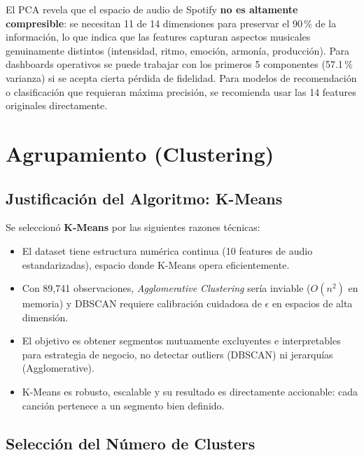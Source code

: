 \documentclass[12pt,a4paper]{article}
\begin{document}
\begin{ejecutivo}
El PCA revela que el espacio de audio de Spotify \textbf{no es altamente compresible}:
se necesitan 11 de 14 dimensiones para preservar el 90\,\% de la informaci\'on, lo que
indica que las features capturan aspectos musicales genuinamente distintos (intensidad,
ritmo, emoci\'on, armon\'ia, producci\'on). Para dashboards operativos se puede trabajar
con los primeros 5 componentes (57.1\,\% varianza) si se acepta cierta p\'erdida de
fidelidad. Para modelos de recomendaci\'on o clasificaci\'on que requieran m\'axima
precisi\'on, se recomienda usar las 14 features originales directamente.
\end{ejecutivo}

\section{Agrupamiento (Clustering)}

\subsection{Justificaci\'on del Algoritmo: K-Means}

Se seleccion\'o \textbf{K-Means} por las siguientes razones t\'ecnicas:

\begin{itemize}[noitemsep]
  \item El dataset tiene estructura num\'erica continua (10 features de audio
    estandarizadas), espacio donde K-Means opera eficientemente.
  \item Con 89{,}741 observaciones, \textit{Agglomerative Clustering} ser\'ia inviable
    ($O(n^2)$ en memoria) y DBSCAN requiere calibraci\'on cuidadosa de $\epsilon$ en
    espacios de alta dimensi\'on.
  \item El objetivo es obtener segmentos mutuamente excluyentes e interpretables para
    estrategia de negocio, no detectar outliers (DBSCAN) ni jerarqu\'ias
    (Agglomerative).
  \item K-Means es robusto, escalable y su resultado es directamente accionable: cada
    canci\'on pertenece a un segmento bien definido.
\end{itemize}

\subsection{Selecci\'on del N\'umero de Clusters}
\end{document}
